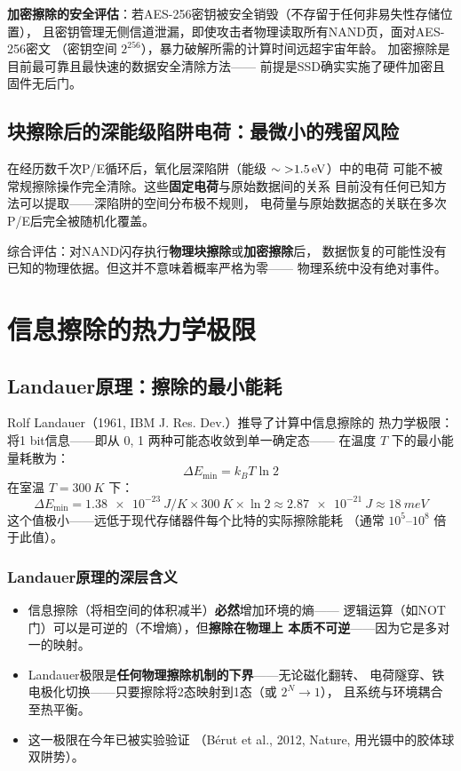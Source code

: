 \documentclass[11pt,a4paper,twoside]{article}
\theoremstyle{definition}\newtheorem{definition}{定义}[section]
\theoremstyle{plain}\newtheorem{theorem}{定理}[section]
\theoremstyle{remark}\newtheorem{remark}{注解}[section]
\begin{document}
\textbf{加密擦除的安全评估}：若AES-256密钥被安全销毁（不存留于任何非易失性存储位置），
且密钥管理无侧信道泄漏，即使攻击者物理读取所有NAND页，面对AES-256密文
（密钥空间 $2^{256}$），暴力破解所需的计算时间远超宇宙年龄。
加密擦除是目前最可靠且最快速的数据安全清除方法——
前提是SSD确实实施了硬件加密且固件无后门。

\subsection{块擦除后的深能级陷阱电荷：最微小的残留风险}

在经历数千次P/E循环后，氧化层深陷阱（能级 $\sim \SI{>1.5}{eV}$）中的电荷
可能不被常规擦除操作完全清除。这些\textbf{固定电荷}与原始数据间的关系
目前没有任何已知方法可以提取——深陷阱的空间分布极不规则，
电荷量与原始数据态的关联在多次P/E后完全被随机化覆盖。

综合评估：对NAND闪存执行\textbf{物理块擦除}或\textbf{加密擦除}后，
数据恢复的可能性没有已知的物理依据。但这并不意味着概率严格为零——
物理系统中没有绝对事件。

\section{信息擦除的热力学极限}
\label{sec:landauer}

\subsection{Landauer原理：擦除的最小能耗}

Rolf Landauer（1961, IBM J. Res. Dev.）推导了计算中信息擦除的
热力学极限：将1 bit信息——即从 {0, 1} 两种可能态收敛到单一确定态——
在温度 $T$ 下的最小能量耗散为：
\begin{equation}\label{eq:landauer-principle}
  \boxed{ \Delta E_{\text{min}} = k_B T \ln 2 }
\end{equation}
在室温 $T = \SI{300}{K}$ 下：
\[
\Delta E_{\text{min}} = \SI{1.38e-23}{J/K} \times \SI{300}{K} \times \ln 2
\approx \SI{2.87e-21}{J} \approx \SI{18}{meV}
\]
这个值极小——远低于现代存储器件每个比特的实际擦除能耗
（通常 $10^5$--$10^8$ 倍于此值）。

\subsubsection{Landauer原理的深层含义}

\begin{itemize}
  \item 信息擦除（将相空间的体积减半）\textbf{必然}增加环境的熵——
  逻辑运算（如NOT门）可以是可逆的（不增熵），但\textbf{擦除在物理上
  本质不可逆}——因为它是多对一的映射。
  \item Landauer极限是\textbf{任何物理擦除机制的下界}——无论磁化翻转、
  电荷隧穿、铁电极化切换——只要擦除将2态映射到1态（或 $2^N \to 1$），
  且系统与环境耦合至热平衡。
  \item 这一极限在今年已被实验验证
  （B\'{e}rut et al., 2012, Nature, 用光镊中的胶体球双阱势）。
\end{itemize}
\end{document}
